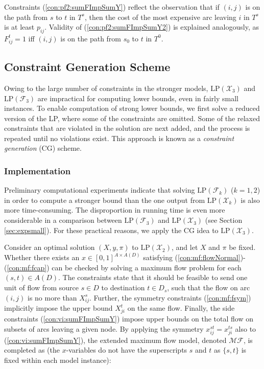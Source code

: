 Constraints (\ref{con:pf2:sumFImpSumY}) reflect the observation that if $(i,j)$ is on the path from $s$ to $t$ in $T^s$,
then the cost of the most expensive arc leaving $i$ in $T^s$ is at least $p_{ij}$.
Validity of (\ref{con:pf2:sumFImpSumY2}) is explained analogously, as $F_{ij}^t=1$ iff $(i,j)$ is on the path from $s_0$ to $t$ in $T^0$.

\subsection{Constraint Generation Scheme}
\label{sec:cg}
Owing to the large number of constraints in the stronger models, $\text{LP}(\mathcal{X}_3)$ and $\text{LP}(\mathcal{F}_3)$ are impractical for computing lower bounds, even in fairly small instances.
To enable computation of strong lower bounds, we first solve a reduced version of the LP, where some of the constraints are omitted.
Some of the relaxed constraints that are violated in the solution are next added, and the process is repeated until no violations exist.
This approach is known as a \emph{constraint generation} (CG) scheme.

\subsubsection{Implementation}%

Preliminary computational experiments indicate that solving $\text{LP}(\mathcal{F}_k)$ ($k=1,2$)
in order to compute a stronger bound than the one output from $\text{LP}(\mathcal{X}_k)$ is also more time-consuming.
The disproportion in running time is even more considerable in a comparison between $\text{LP}(\mathcal{F}_3)$ and $\text{LP}(\mathcal{X}_3)$ (see Section \ref{sec:expsmall}).
For these practical reasons, we apply the CG idea to $\text{LP}(\mathcal{X}_3)$.

Consider an optimal solution $(X,y,\pi)$ to $\text{LP}(\mathcal{X}_2)$, and let $X$ and $\pi$ be fixed.
Whether there exists an $x\in\left[0,1\right]^{A\times A(D)}$ satisfying (\ref{con:mf:flowNormal})-(\ref{con:mf:fcap}) can be checked by solving a maximum flow problem for each $(s,t)\in A(D)$.
The constraints state that it should be feasible to send one unit of flow from source $s\in D$ to destination $t\in D_s$,
such that the flow on arc $(i,j)$ is no more than $X_{ij}^s$.
Further, the symmetry constraints (\ref{con:mf:fsym}) implicitly impose the upper bound $X_{ji}^t$ on the same flow.
Finally, the side constraints (\ref{con:vi:sumFImpSumY}) impose upper bounds on the total flow on subsets of arcs leaving a given node.
By applying the symmetry $x_{ij}^{st}=x_{ji}^{ts}$ also to (\ref{con:vi:sumFImpSumY}), the extended maximum flow model, denoted $\mathcal{MF}$, is completed as
(the $x$-variables do not have the superscripts $s$ and $t$ as $\{s,t\}$ is fixed within each model instance):

